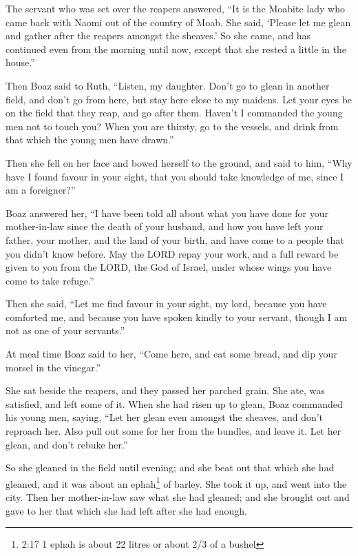  The servant who was set over the reapers answered, ``It is
the Moabite lady who came back with Naomi out of the country of Moab.
 She said, `Please let me glean and gather after the reapers
amongst the sheaves.' So she came, and has continued even from the
morning until now, except that she rested a little in the house.''

 Then Boaz said to Ruth, ``Listen, my daughter. Don't go to
glean in another field, and don't go from here, but stay here close to
my maidens.  Let your eyes be on the field that they reap,
and go after them. Haven't I commanded the young men not to touch you?
When you are thirsty, go to the vessels, and drink from that which the
young men have drawn.''

 Then she fell on her face and bowed herself to the ground,
and said to him, ``Why have I found favour in your sight, that you
should take knowledge of me, since I am a foreigner?''

 Boaz answered her, ``I have been told all about what you
have done for your mother-in-law since the death of your husband, and
how you have left your father, your mother, and the land of your birth,
and have come to a people that you didn't know before.  May
the LORD repay your work, and a full reward be given to you from the
LORD, the God of Israel, under whose wings you have come to take
refuge.''

 Then she said, ``Let me find favour in your sight, my
lord, because you have comforted me, and because you have spoken kindly
to your servant, though I am not as one of your servants.''

 At meal time Boaz said to her, ``Come here, and eat some
bread, and dip your morsel in the vinegar.''

She sat beside the reapers, and they passed her parched grain. She ate,
was satisfied, and left some of it.  When she had risen up
to glean, Boaz commanded his young men, saying, ``Let her glean even
amongst the sheaves, and don't reproach her.  Also pull out
some for her from the bundles, and leave it. Let her glean, and don't
rebuke her.''

 So she gleaned in the field until evening; and she beat
out that which she had gleaned, and it was about an ephah\footnote{2:17
  1 ephah is about 22 litres or about 2/3 of a bushel} of barley.
 She took it up, and went into the city. Then her
mother-in-law saw what she had gleaned; and she brought out and gave to
her that which she had left after she had enough.

